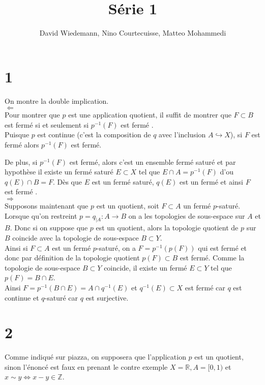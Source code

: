 \documentclass[11pt, a4paper]{article}
\begin{document}
\title{Série 1}
\author{David Wiedemann, Nino Courtecuisse, Matteo Mohammedi}
\maketitle
\section*{1}
On montre la double implication.\\

$\Longleftarrow$\\
Pour montrer que $p$ est une application quotient, il suffit de montrer que $F \subset B$ est fermé si et seulement si $p^{-1}( F) $ est fermé .\\
Puisque $p$ est continue (c'est la composition de $q$ avec l'inclusion $ A \hookrightarrow X$), si $F$ est fermé alors $p^{-1}( F) $ est fermé.

De plus, si $p^{-1}( F) $ est fermé, alors c'est un ensemble fermé saturé et par hypothèse il existe un fermé saturé $ E \subset X$ tel que $E\cap A = p^{-1}( F )$ d'ou $q( E) \cap B = F$. Dès que $E$ est un fermé saturé, $q( E) $ est un fermé et ainsi $F$ est fermé .\\

$\Longrightarrow$\\
Supposons maintenant que $p$ est un quotient, soit $ F \subset A$ un fermé $p$-saturé.\\
Lorsque qu'on restreint \(p=q_{|A} : A\to B\) on a les topologies de sous-espace sur \(A\) et \(B\). Donc si on suppose que \(p\) est un quotient, alors la topologie quotient de \(p\) sur \(B\) coincide avec la topologie de sous-espace \(B\subset Y\). \\
Ainsi si \(F\subset A\) est un fermé \(p\)-saturé, on a \(F=p^{-1}(p(F))\) qui est fermé et donc par définition de la topologie quotient \(p(F)\subset B\) est fermé. Comme la topologie de sous-espace \(B\subset Y\) coincide, il existe un fermé \(E\subset Y\) tel que \(p(F) = B\cap E\). \\
Ainsi \(F = p^{-1}(B\cap E) = A\cap q^{-1}(E)\) et \(q^{-1}(E) \subset X\) est fermé car \(q\) est continue et \(q\)-saturé car \(q\) est surjective. \\


\section*{2}
Comme indiqué sur piazza, on supposera que l'application $p$ est un quotient, sinon l'énoncé est faux en prenant le contre exemple $ X = \mathbb{R}, A = [ 0,1) $ et $x\sim y \iff x-y \in \mathbb{Z}$.\\
\end{document}
